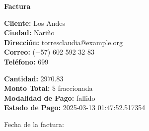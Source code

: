 \documentclass{article}
\begin{document}
\begin{center}
    {\LARGE \textbf{Factura}}\\[1cm]
\end{center}

\textbf{Cliente:} Los Andes \\
\textbf{Ciudad:} Nariño \\
\textbf{Dirección:} torresclaudia@example.org \\
\textbf{Correo:} (+57) 602 592 32 83 \\
\textbf{Teléfono:} 699 \\

\vspace{0.5cm}

\textbf{Cantidad:} 2970.83 \\
\textbf{Monto Total:} \$ fraccionada \\
\textbf{Modalidad de Pago:} fallido \\
\textbf{Estado de Pago:} 2025-03-13 01:47:52.517354 \\

\vspace{1cm}

Fecha de la factura: 
\end{document}

